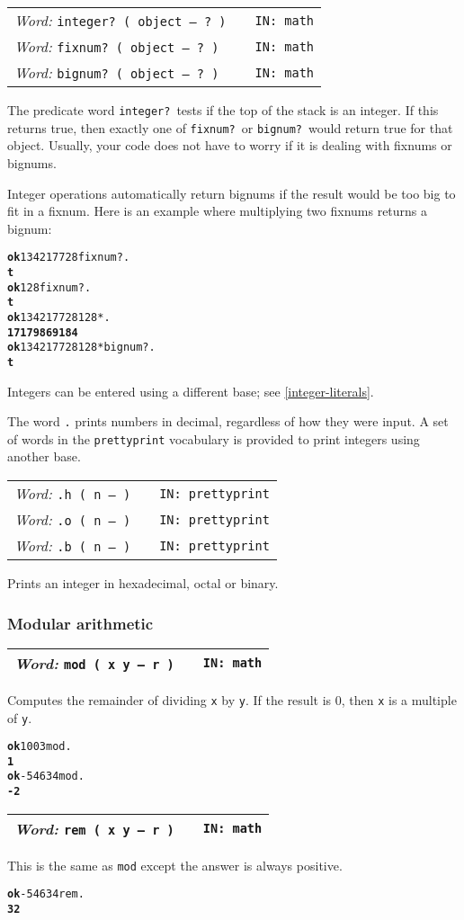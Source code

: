 \documentclass{report}
\newcommand{\ordinaryword}[3]{\index{#1}
\emph{Word:} \texttt{#2} &&\texttt{IN: #3}}
\newcommand{\predword}[2]{\ordinaryword{#1}{#1~( object -- ?~)}{#2}}
\newcommand{\wordtable}[1]{

\begin{tabularx}{12cm}[t]{lXr}
\hline
#1\\
\hline
\end{tabularx}

}
\begin{document}
\wordtable{
\predword{integer?}{math}\\
\predword{fixnum?}{math}\\
\predword{bignum?}{math}
}
The predicate word \texttt{integer?}~tests if the top of the stack is an integer. If this returns true, then exactly one of \texttt{fixnum?}~or \texttt{bignum?}~would return true for that object. Usually, your code does not have to worry if it is dealing with fixnums or bignums.

Integer operations automatically return bignums if the result would be too big to fit in a fixnum. Here is an example where multiplying two fixnums returns a bignum:

\begin{alltt}
\textbf{ok} 134217728 fixnum? .
\textbf{t}
\textbf{ok} 128 fixnum? .
\textbf{t}
\textbf{ok} 134217728 128 * .
\textbf{17179869184}
\textbf{ok} 134217728 128 * bignum? .
\textbf{t}
\end{alltt}

Integers can be entered using a different base; see \ref{integer-literals}.

The word \texttt{.} prints numbers in decimal, regardless of how they were input. A set of words in the \texttt{prettyprint} vocabulary is provided to print integers using another base.

\wordtable{
\ordinaryword{.h}{.h ( n -- )}{prettyprint}\\
\ordinaryword{.o}{.o ( n -- )}{prettyprint}\\
\ordinaryword{.b}{.b ( n -- )}{prettyprint}
}
Prints an integer in hexadecimal, octal or binary.

\subsubsection{Modular arithmetic}

\wordtable{
\ordinaryword{mod}{mod ( x y -- r )}{math}
}
Computes the remainder of dividing \texttt{x} by \texttt{y}. If the result is 0, then \texttt{x} is a multiple of \texttt{y}.
\begin{alltt}
\textbf{ok} 100 3 mod .
\textbf{1}
\textbf{ok} -546 34 mod .
\textbf{-2}
\end{alltt}
\wordtable{
\ordinaryword{rem}{rem ( x y -- r )}{math}
}
This is the same as \texttt{mod} except the answer is always positive.
\begin{alltt}
\textbf{ok} -546 34 rem .
\textbf{32}
\end{alltt}
\end{document}
